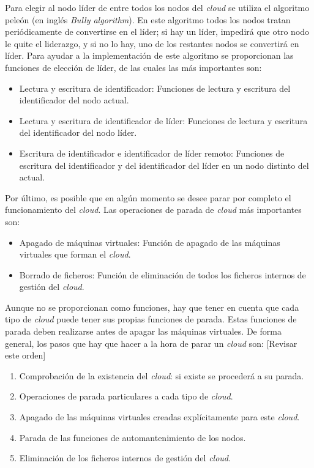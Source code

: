 Para elegir al nodo líder de entre todos los nodos del \emph{cloud} se utiliza el algoritmo peleón (en inglés \emph{Bully algorithm}). En este algoritmo todos los nodos tratan periódicamente de convertirse en el líder; si hay un líder, impedirá que otro nodo le quite el liderazgo, y si no lo hay, uno de los restantes nodos se convertirá en líder. Para ayudar a la implementación de este algoritmo se proporcionan las funciones de elección de líder, de las cuales las más importantes son:
\begin{itemize}
\item Lectura y escritura de identificador: Funciones de lectura y escritura del identificador del nodo actual.
\item Lectura y escritura de identificador de líder: Funciones de lectura y escritura del identificador del nodo líder.
\item Escritura de identificador e identificador de líder remoto: Funciones de escritura del identificador y del identificador del líder en un nodo distinto del actual.
\end{itemize}

Por último, es posible que en algún momento se desee parar por completo el funcionamiento del \emph{cloud}. Las operaciones de parada de \emph{cloud} más importantes son:
\begin{itemize}
\item Apagado de máquinas virtuales: Función de apagado de las máquinas virtuales que forman el \emph{cloud}.
\item Borrado de ficheros: Función de eliminación de todos los ficheros internos de gestión del \emph{cloud}.
\end{itemize}

Aunque no se proporcionan como funciones, hay que tener en cuenta que cada tipo de \emph{cloud} puede tener sus propias funciones de parada. Estas funciones de parada deben realizarse antes de apagar las máquinas virtuales. De forma general, los pasos que hay que hacer a la hora de parar un \emph{cloud} son:
[Revisar este orden]
\begin{enumerate}
\item Comprobación de la existencia del \emph{cloud}: si existe se procederá a su parada.
\item Operaciones de parada particulares a cada tipo de \emph{cloud}.
\item Apagado de las máquinas virtuales creadas explícitamente para este \emph{cloud}.
\item Parada de las funciones de automantenimiento de los nodos.
\item Eliminación de los ficheros internos de gestión del \emph{cloud}.
\end{enumerate}


